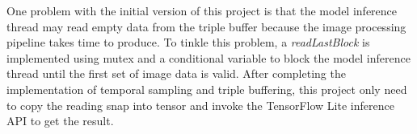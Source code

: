 One problem with the initial version of this project is that the model inference thread may read empty data from the triple buffer because the image processing pipeline takes time to produce.
To tinkle this problem, a \textit{readLastBlock} is implemented using mutex and a conditional variable to block the model inference thread until the first set of image data is valid.
After completing the implementation of temporal sampling and triple buffering,  this project only need to copy the reading snap into tensor and invoke the TensorFlow Lite inference API to get the result.
